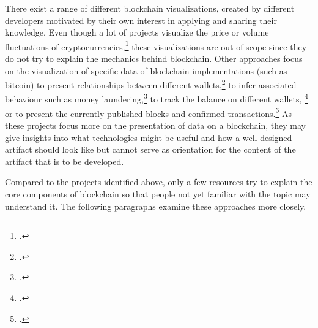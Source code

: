 There exist a range of different blockchain visualizations, created by different developers motivated by their own interest in applying and sharing their knowledge. Even though a lot of projects visualize the price or volume fluctuations of cryptocurrencies,\footcites[Cf.][]{SapekCryptowatchliveBitcoin2014}[cf.][]{CryptoMapsCryptocurrencyMarket} these visualizations are out of scope since they do not try to explain the mechanics behind blockchain. Other approaches focus on the visualization of specific data of blockchain implementations (such as bitcoin) to present relationships between different wallets,\footcites[Cf.][]{Reidanalysisanonymitybitcoin2013}[cf.][]{BaumannExploringBitcoinnetwork2014}[cf.][]{Interaqt2016}[cf.][]{McGinnVisualizingDynamicBitcoin2016}[cf.][]{McGinnOpenDataBlockchain2018} to infer associated behaviour such as money laundering,\footcites[Cf.][]{Meiklejohnfistfulbitcoinscharacterizing2013}[cf.][]{EllipticEnterprisesLimitedEllipticBitcoinBig} to track the balance on different wallets, \footcites[Cf.][]{EtherScanEthereumBlock}[cf.][]{BlcokchainLuxembourgS.A.R.L.BlockchaininfoBitcoin} or to present the currently published blocks and confirmed transactions.\footcites[Cf.][]{BattistaBitconeviewvisualizationflows2015}[cf.][]{BitcoinCityinfoRoad}[cf.][]{Bitbonkers2016}[cf.][]{BlockSeer2015}[cf.][]{DailyBlockchainBlockchain2013}[cf][]{YeowBitcoinNodesGlobal2018}[cf.][]{LaumeisterBitListenBitcoinTransaction2015}[cf.][]{MillerBitcoinVisualizer2015}[cf.][]{VisualizingBitcoinTransactions2015}[cf.][]{Blockchain3DExplorer2017} As these projects focus more on the presentation of data on a blockchain, they may give insights into what technologies might be useful and how a well designed artifact should look like but cannot serve as orientation for the content of the artifact that is to be developed. 

Compared to the projects identified above, only a few resources try to explain the core components of blockchain so that people not yet familiar with the topic may understand it. The following paragraphs examine these approaches more closely. 

